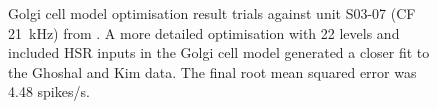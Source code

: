 \begin{figure}[htb]
  \centering
  \caption[Golgi cell model optimisation results]{Golgi cell model optimisation result trials against unit S03-07 (CF 21~kHz) from \citet{GhoshalKim:1996}.
A more detailed optimisation with 22 levels and included HSR inputs in the Golgi cell model generated a closer fit to the Ghoshal and Kim data.
The final root mean squared error was 4.48 spikes/s.
 \label{fig:GolgiResult}}
\end{figure}




